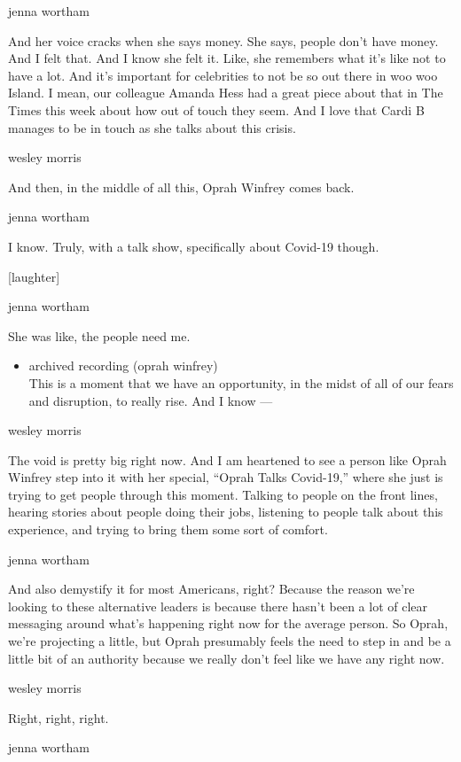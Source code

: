 jenna wortham

And her voice cracks when she says money. She says, people don't have
money. And I felt that. And I know she felt it. Like, she remembers what
it's like not to have a lot. And it's important for celebrities to not
be so out there in woo woo Island. I mean, our colleague Amanda Hess had
a great piece about that in The Times this week about how out of touch
they seem. And I love that Cardi B manages to be in touch as she talks
about this crisis.

wesley morris

And then, in the middle of all this, Oprah Winfrey comes back.

jenna wortham

I know. Truly, with a talk show, specifically about Covid-19 though.

{[}laughter{]}

jenna wortham

She was like, the people need me.

\begin{itemize}
\tightlist
\item
  archived recording (oprah winfrey)\\
  This is a moment that we have an opportunity, in the midst of all of
  our fears and disruption, to really rise. And I know ---
\end{itemize}

wesley morris

The void is pretty big right now. And I am heartened to see a person
like Oprah Winfrey step into it with her special, ``Oprah Talks
Covid-19,'' where she just is trying to get people through this moment.
Talking to people on the front lines, hearing stories about people doing
their jobs, listening to people talk about this experience, and trying
to bring them some sort of comfort.

jenna wortham

And also demystify it for most Americans, right? Because the reason
we're looking to these alternative leaders is because there hasn't been
a lot of clear messaging around what's happening right now for the
average person. So Oprah, we're projecting a little, but Oprah
presumably feels the need to step in and be a little bit of an authority
because we really don't feel like we have any right now.

wesley morris

Right, right, right.

jenna wortham

